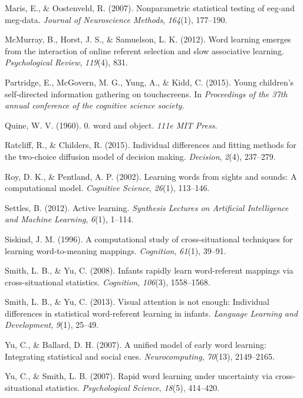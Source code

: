 \documentclass[man,floatsintext]{apa6}
\begin{document}
\hypertarget{ref-maris2007nonparametric}{}
Maris, E., \& Oostenveld, R. (2007). Nonparametric statistical testing
of eeg-and meg-data. \emph{Journal of Neuroscience Methods},
\emph{164}(1), 177--190.

\hypertarget{ref-mcmurray2012word}{}
McMurray, B., Horst, J. S., \& Samuelson, L. K. (2012). Word learning
emerges from the interaction of online referent selection and slow
associative learning. \emph{Psychological Review}, \emph{119}(4), 831.

\hypertarget{ref-partridge2015young}{}
Partridge, E., McGovern, M. G., Yung, A., \& Kidd, C. (2015). Young
children's self-directed information gathering on touchscreens. In
\emph{Proceedings of the 37th annual conference of the cognitive science
society}.

\hypertarget{ref-quine19600}{}
Quine, W. V. (1960). 0. word and object. \emph{111e MIT Press}.

\hypertarget{ref-ratcliff2015individual}{}
Ratcliff, R., \& Childers, R. (2015). Individual differences and fitting
methods for the two-choice diffusion model of decision making.
\emph{Decision}, \emph{2}(4), 237--279.

\hypertarget{ref-roy2002learning}{}
Roy, D. K., \& Pentland, A. P. (2002). Learning words from sights and
sounds: A computational model. \emph{Cognitive Science}, \emph{26}(1),
113--146.

\hypertarget{ref-settles2012active}{}
Settles, B. (2012). Active learning. \emph{Synthesis Lectures on
Artificial Intelligence and Machine Learning}, \emph{6}(1), 1--114.

\hypertarget{ref-siskind1996computational}{}
Siskind, J. M. (1996). A computational study of cross-situational
techniques for learning word-to-meaning mappings. \emph{Cognition},
\emph{61}(1), 39--91.

\hypertarget{ref-smith2008infants}{}
Smith, L. B., \& Yu, C. (2008). Infants rapidly learn word-referent
mappings via cross-situational statistics. \emph{Cognition},
\emph{106}(3), 1558--1568.

\hypertarget{ref-smith2013visual}{}
Smith, L. B., \& Yu, C. (2013). Visual attention is not enough:
Individual differences in statistical word-referent learning in infants.
\emph{Language Learning and Development}, \emph{9}(1), 25--49.

\hypertarget{ref-yu2007unified}{}
Yu, C., \& Ballard, D. H. (2007). A unified model of early word
learning: Integrating statistical and social cues.
\emph{Neurocomputing}, \emph{70}(13), 2149--2165.

\hypertarget{ref-yu2007rapid}{}
Yu, C., \& Smith, L. B. (2007). Rapid word learning under uncertainty
via cross-situational statistics. \emph{Psychological Science},
\emph{18}(5), 414--420.

\endgroup
\end{document}
